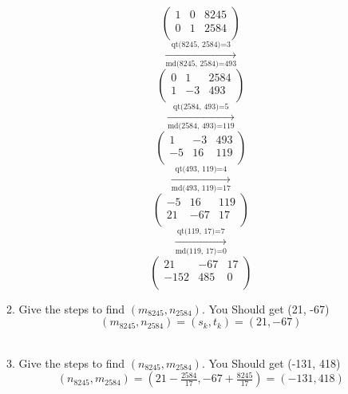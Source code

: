 \documentclass[11pt]{article}
\begin{document}
\begin{enumerate}
\begin{enumerate}
\begin{equation*}
\left(
\begin{array}{ccc}
 1 & 0 & 8245 \\
 0 & 1 & 2584 \\
\end{array}
\right)
\end{equation*}
$$\xrightarrow[\text{md(8245, 2584)=493}]{\text{qt(8245, 2584)=3}}$$
\begin{equation*}
\left(
\begin{array}{ccc}
 0 & 1 & 2584 \\
 1 & -3 & 493 \\
\end{array}
\right)
\end{equation*}
$$\xrightarrow[\text{md(2584, 493)=119}]{\text{qt(2584, 493)=5}}$$
\begin{equation*}
\left(
\begin{array}{ccc}
 1 & -3 & 493 \\
 -5 & 16 & 119 \\
\end{array}
\right)
\end{equation*}
$$\xrightarrow[\text{md(493, 119)=17}]{\text{qt(493, 119)=4}}$$
\begin{equation*}
\left(
\begin{array}{ccc}
 -5 & 16 & 119 \\
 21 & -67 & 17 \\
\end{array}
\right)
\end{equation*}
$$\xrightarrow[\text{md(119, 17)=0}]{\text{qt(119, 17)=7}}$$
\begin{equation*}
\left(
\begin{array}{ccc}
 21 & -67 & 17 \\
 -152 & 485 & 0 \\
\end{array}
\right)
\end{equation*}

\item Give the steps to find $(m_{8245}, n_{2584})$.  You Should get (21, -67)
\\
$$(m_{8245}, n_{2584})  = (s_k, t_k) = (21, -67)$$
\\
\item Give the steps to find $(n_{8245}, m_{2584})$.  You Should get (-131, 418)
\\
$$(n_{8245}, m_{2584}) = (21 - \tfrac{2584}{17}, -67 + \tfrac{8245}{17}) = (-131, 418)$$
\end{enumerate}



\end{enumerate}
\end{document}
